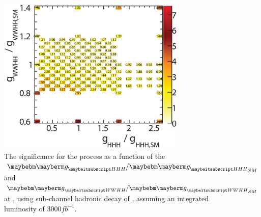 \begin{figure}[!tbp]
    \includegraphics[width=0.8\textwidth]{doubleHiggs/extraction/SignificanceBono3}
\caption{The significance for the \eeToHH process as a function of the $\gHHH/\gHHH_{SM}$ and  $\gWWHH/\gWWHH_{SM}$ at , using sub-channel hadronic \WW decay of \eeToHHbbWW, assuming an integrated luminosity of  3000$fb^{-1}$.}
   \label{fig:doubleHiggsCouplingSignificancebbWW}
\end{figure}

